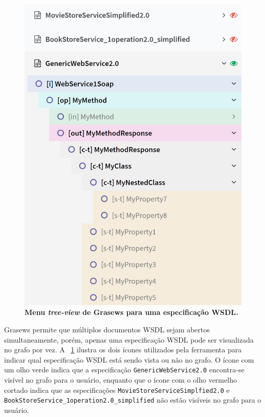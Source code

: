 \begin{figure}[h]
    \includegraphics[scale=0.7]{4-grasews/imagens/grasews-menu-tree-view-wsdl.png}
    \centering
    \caption[Menu \textit{tree-view} de Grasews para uma especificação WSDL]{\textbf{Menu \textit{tree-view} de Grasews para uma especificação WSDL.}}
    \label{fig:grasews-menu-tree-view-wsdl}
\end{figure}

Grasews permite que múltiplos documentos WSDL sejam abertos simultaneamente, porém, apenas uma especificação WSDL pode ser visualizada no grafo por vez. A \figurename~\ref{fig:grasews-menu-tree-view-wsdl} ilustra os dois ícones utilizados pela ferramenta para indicar qual especificação WSDL está sendo vista ou não no grafo. O ícone com um olho verde indica que a especificação \texttt{GenericWebService2.0} encontra-se visível no grafo para o usuário, enquanto que o ícone com o olho vermelho cortado indica que as especificações \texttt{MovieStoreServiceSimplfied2.0} e \texttt{BookStoreService\_1operation2.0\_simplified} não estão visíveis no grafo para o usuário.

